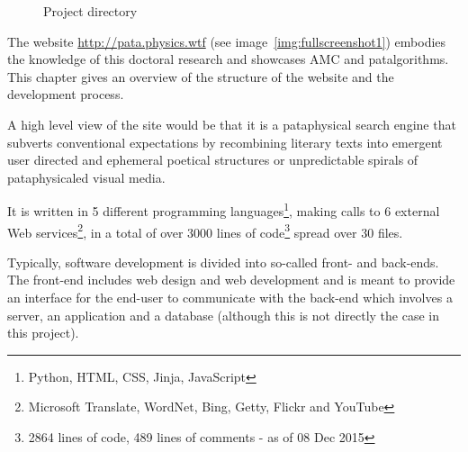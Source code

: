 \begin{figure}
  \centering
  \caption[Project directory]{Project directory}
  \label{fig:dir}
  \vspace{-2cm}
\end{figure}

The website \url{http://pata.physics.wtf} (see image~\ref{img:fullscreenshot1}) embodies the knowledge of this doctoral research and showcases \ac{AMC} and patalgorithms. This chapter gives an overview of the structure of the website and the development process.

A high level view of the site would be that it is a pataphysical search engine that subverts conventional expectations by recombining literary texts into emergent user directed and ephemeral poetical structures or unpredictable spirals of pataphysicaled visual media. 

It is written in \num{5} different programming languages\footnote{Python, HTML, CSS, Jinja, JavaScript}, making calls to \num{6} external Web services\footnote{Microsoft Translate, WordNet, Bing, Getty, Flickr and YouTube}, in a total of over \num{3000} lines of code\footnote{\num{2864} lines of code, \num{489} lines of comments - as of 08 Dec 2015} spread over \num{30} files. 

Typically, software development is divided into so-called front- and back-ends. The front-end includes web design and web development and is meant to provide an interface for the end-user to communicate with the back-end which involves a server, an application and a database (although this is not directly the case in this project).

